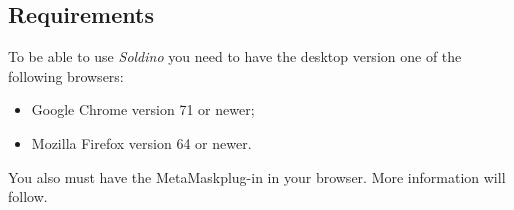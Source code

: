 	\subsection{Requirements}
	To be able to use \textit{Soldino} you need to have the desktop version 
	one of the following browsers:
	\begin{itemize}
		\item Google Chrome version 71 or newer;
		\item Mozilla Firefox version 64 or newer.
	\end{itemize}
	You also must have the MetaMask\glosp plug-in in your browser. More 
	information will follow. 